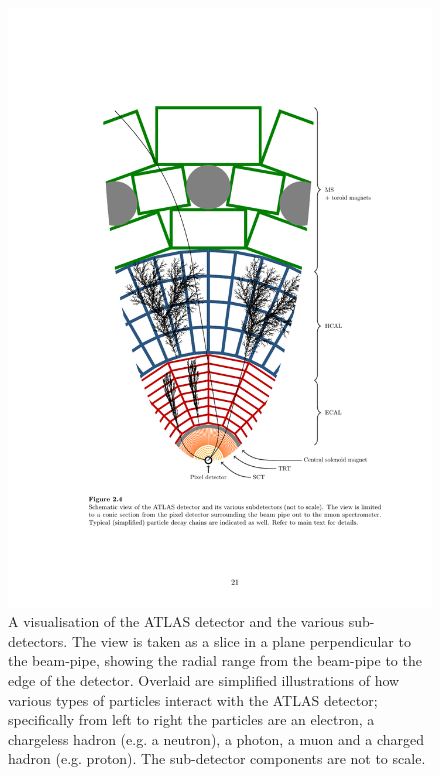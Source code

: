 \begin{figure}[!ht]
  \begin{center}
    \includegraphics[width=1\linewidth, angle=0]{figs/Detector/ATLAS_slice.pdf}
  \end{center}
  \caption{A visualisation of the ATLAS detector and the various sub-detectors.
    The view is taken as a slice in a plane perpendicular to the beam-pipe,
    showing the radial range from the beam-pipe to the edge of the detector.
    Overlaid are simplified illustrations of how various types of particles interact with the ATLAS detector;
    specifically from left to right the particles are an electron, a chargeless hadron (e.g. a neutron), a photon, a muon and a charged hadron (e.g. proton).
    The sub-detector components are not to scale.}
  \label{fig:det-ATLAS_slice}
\end{figure}

